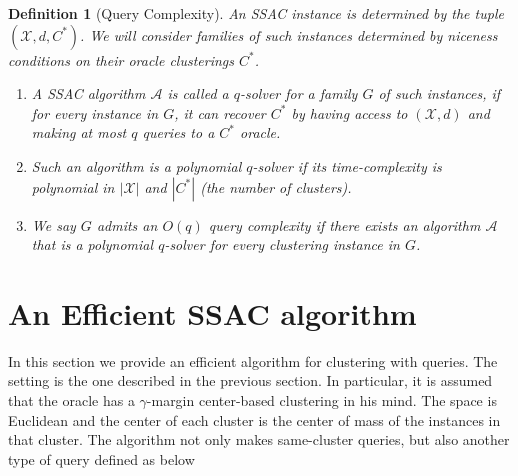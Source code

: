 \documentclass{article}
\newcommand{\mc}{\mathcal}
\newtheorem{definition}[theorem]{Definition}
\begin{document}


\begin{definition}[Query Complexity]
\label{definition:QueryComplexity}
An SSAC instance is determined by the tuple $(\mc X, d, C^*)$. 
We will consider families of such instances determined by niceness conditions on their oracle clusterings $C^*$.
\begin{enumerate}
\item A SSAC algorithm $\mc A$ is called a $q$-solver for a family $G$ of such instances, if for every instance in $G$, it can recover $C^*$ by having access to $(\mc X, d)$ and making at most $q$ queries to a $C^*$ oracle. 

\item Such an algorithm is a polynomial $q$-solver if its time-complexity is polynomial in $|\mc X|$ and $|C^*|$ (the number of clusters).

\item  We say $G$ admits an $O(q)$ query complexity if there exists an algorithm $\mc A$ that is a polynomial $q$-solver for every clustering instance in $G$.
\end{enumerate}

\end{definition}

\section{An Efficient SSAC algorithm}
\label{section:clusteringWithQuery}

In this section we provide an efficient algorithm for clustering with queries. The setting is the one described in the previous section. In particular, it is assumed that the oracle has a $\gamma$-margin center-based clustering in his mind. The space is Euclidean and the center of each cluster is the center of mass of the instances in that cluster. The algorithm not only makes same-cluster queries, but also another type of query defined as below%
\end{document}
